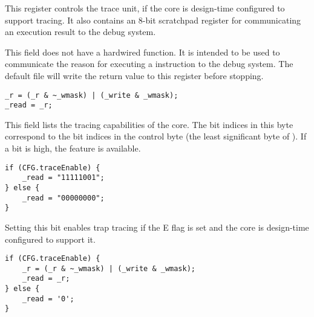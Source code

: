 
This register controls the trace unit, if the core is design-time configured to
support tracing. It also contains an 8-bit scratchpad register for communicating
an execution result to the debug system.

This field does not have a hardwired function. It is intended to be used to
communicate the reason for executing a  instruction to the debug
system. The default  file will write the  return
value to this register before stopping.

\signed{}
\declaration{}
\implementation{}
\begin{lstlisting}
_r = (_r & ~_wmask) | (_write & _wmask);
_read = _r;
\end{lstlisting}

This field lists the tracing capabilities of the core. The bit indices in this
byte correspond to the bit indices in the control byte (the least significant
byte of ). If a bit is high, the feature is available.

\implementation{}
\begin{lstlisting}
if (CFG.traceEnable) {
    _read = "11111001";
} else {
    _read = "00000000";
}
\end{lstlisting}

Setting this bit enables trap tracing if the E flag is set and the core is 
design-time configured to support it.

\declaration{}
\implementation{}
\begin{lstlisting}
if (CFG.traceEnable) {
    _r = (_r & ~_wmask) | (_write & _wmask);
    _read = _r;
} else {
    _read = '0';
}
\end{lstlisting}

